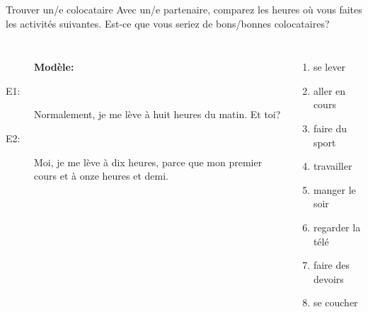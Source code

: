 \documentclass{beamer}
\begin{document}
  \begin{frame}{Trouver un/e colocataire}
    Avec un/e partenaire, comparez les heures où vous faites les activités suivantes.
    Est-ce que vous seriez de bons/bonnes colocataires? \\
    \begin{columns}
        \begin{description}
          \item[] \textbf{Modèle:}
          \item[] 
          \item[E1:] Normalement, je me lève à huit heures du matin. Et toi?
          \item[E2:] Moi, je me lève à dix heures, parce que mon premier cours et à onze heures et demi.
        \end{description}
        \small
        \begin{enumerate}
          \item se lever
          \item aller en cours
          \item faire du sport
          \item travailler
          \item manger le soir
          \item regarder la télé
          \item faire des devoirs
          \item se coucher
        \end{enumerate}
    \end{columns}
  \end{frame}
\end{document}
